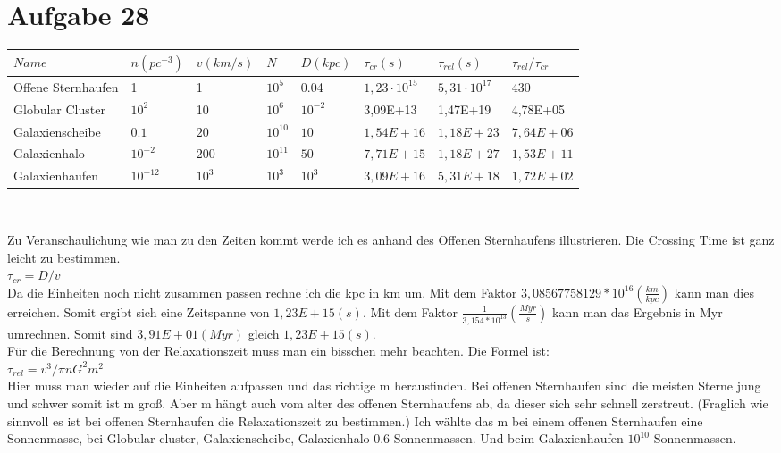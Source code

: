 \section{Aufgabe 28}

\begin{center}
\begin{tabular}{|l|l|l|l|l|l|l|l|}
\hline
\(Name\) & $n(pc^{-3})$ & $v(km/s)$ & $N$ & $D(kpc)$ & $\tau_{cr}(s)$ & $\tau_{rel}(s)$ & $\tau_{rel}/\tau_{cr}$ \\
\hline
Offene Sternhaufen & 1 & 1 & $10^5$ & 0.04 & $1,23 \cdot 10^{15}$  & $5,31 \cdot 10^{17}$  & $430$\\			
\hline
Globular Cluster & $10^2$ & 10 & $10^6$ & $10^{-2}$ & 3,09E+13 & 1,47E+19 & 4,78E+05\\ 				

\hline
Galaxienscheibe & $0.1$ & $20$ & $10^{10}$ & $10$ & $1,54E+16$ & $1,18E+23$ &  $7,64E+06$ \\ 				

\hline
Galaxienhalo & $10^{-2}$ & $200$ & $10^{11}$ & $50$ & $7,71E+15$ &  $1,18E+27$ & $1,53E+11$ \\ 				

\hline
Galaxienhaufen & $10^{-12}$ & $10^3$ & $10^3$ & $10^3$ & $3,09E+16$  & $5,31E+18$ &  $1,72E+02$\\ 		
	

\hline
\end{tabular}\\
\end{center}
Zu Veranschaulichung wie man zu den Zeiten kommt werde ich es anhand des Offenen Sternhaufens illustrieren. 
Die Crossing Time ist ganz leicht zu bestimmen.\\
$\tau_{cr} = D/v$\\
Da die Einheiten noch nicht zusammen passen rechne ich die kpc in km um. Mit dem Faktor $3,08567758129*10^{16} (\frac{km}{kpc})$ kann man dies erreichen. Somit ergibt sich eine Zeitspanne von $1,23E+15 (s)$. Mit dem Faktor $\frac{1}{3,154*10^{13}} (\frac{Myr}{s})$ kann man das Ergebnis in Myr umrechnen.
Somit sind $3,91E+01 (Myr)$ gleich $1,23E+15 (s)$.\\
Für die Berechnung von der Relaxationszeit muss man ein bisschen mehr beachten. Die Formel ist:\\
$\tau_{rel} = v^3/\pi n G^2 m^2$\\
Hier muss man wieder auf die Einheiten aufpassen und das richtige m herausfinden. Bei offenen Sternhaufen sind die meisten Sterne jung und schwer somit ist m groß. Aber m hängt auch vom alter des offenen Sternhaufens ab, da dieser sich sehr schnell zerstreut. (Fraglich wie sinnvoll es ist bei offenen Sternhaufen die Relaxationszeit zu bestimmen.) Ich wählte das m bei einem offenen Sternhaufen eine Sonnenmasse, bei Globular cluster, Galaxienscheibe, Galaxienhalo 0.6 Sonnenmassen. Und beim Galaxienhaufen $10^{10}$ Sonnenmassen.
